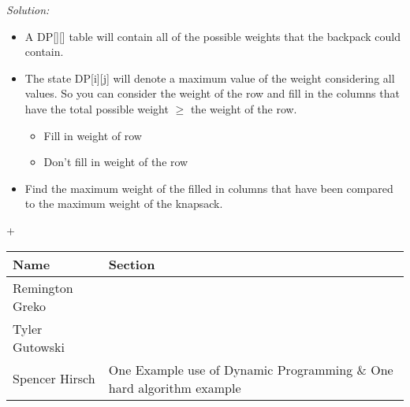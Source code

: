 \documentclass{article}
\begin{document}
\medskip

\noindent \textit{Solution:} \\
\begin{itemize}
    \item A DP[][] table will contain all of the possible weights that the backpack could
    contain.
    \item The state DP[i][j] will denote a maximum value of the weight considering all values.
          So you can consider the weight of the row and fill in the columns that have the total
          possible weight $\geq$ the weight of the row.
    \begin{itemize}
        \item Fill in weight of row
        \item Don't fill in weight of the row
    \end{itemize}
    \item Find the maximum weight of the filled in columns that have been compared to the maximum
          weight of the knapsack.
\end{itemize}


\pagebreak+

\begin{center}
        \begin{tabular}{|p{3cm}|p{6cm}|}
            \hline
            \textbf{Name} & \textbf{Section} \\
            \hline
            Remington Greko &  \\
            \hline
            Tyler Gutowski &  \\
            \hline
            Spencer Hirsch & One Example use of Dynamic Programming $\&$ One hard algorithm example\\
            \hline
        \end{tabular}
    \end{center}
    
\end{document}
